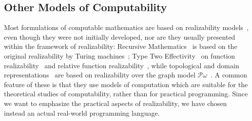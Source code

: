 \subsection{Other Models of Computability}
\label{sec:models-of-computability}

Most formulations of computable mathematics are based on realizability
models~\cite{Bauer:00}, even though they were not initially developed,
nor are they usually presented within the framework of realizability:
Recursive Mathematics~\cite{ershov98:_handb_recur_mathem} is based on
the original realizability by Turing machines~\cite{KleeneSC:intint};
Type Two Effectivity~\cite{Wei00} on function
realizability~\cite{KleeneSC:fouim} and relative function
realizability~\cite{BirkedalL:devttc}, while topological and domain
representations~\cite{Bla97a,Bauer:Birkedal:Scott:98} are based on
realizability over the graph model
$\mathcal{P}\omega$~\cite{ScottD:dattl}. A common feature of these is
that they use models of computation which are suitable for the
theoretical studies of computability, rather than for practical
programming. Since we want to emphasize the practical aspects of
realizability, we have chosen instead an actual real-world programming
language.


